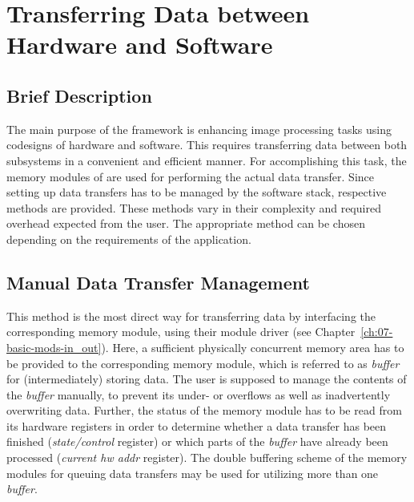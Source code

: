 


\section{Transferring Data between Hardware and Software}\label{ch:04-software-data-trans}


\subsection{Brief Description}

The main purpose of the \asterics framework is enhancing image processing tasks using codesigns of hardware and software.
This requires transferring data between both subsystems in a convenient and efficient manner.
For accomplishing this task, the memory modules of \asterics are used for performing the actual data transfer. 
Since setting up data transfers has to be managed by the software stack, respective methods are provided.
These methods vary in their complexity and required overhead expected from the user.
The appropriate method can be chosen depending on the requirements of the application.

\subsection{Manual Data Transfer Management}
This method is the most direct way for transferring data by interfacing the corresponding memory module, using their module driver (see Chapter~\ref{ch:07-basic-mods-in_out}).
Here, a sufficient physically concurrent memory area has to be provided to the corresponding memory module, which is referred to as \textit{buffer} for (intermediately) storing data.
The user is supposed to manage the contents of the \textit{buffer} manually, to prevent its under- or overflows as well as inadvertently overwriting data.
Further, the status of the memory module has to be read from its hardware registers in order to determine whether a data transfer has been finished (\textit{state/control} register) or which parts of the \textit{buffer} have already been processed (\textit{current hw addr} register).
The double buffering scheme of the memory modules for queuing data transfers may be used for utilizing more than one \textit{buffer}.

